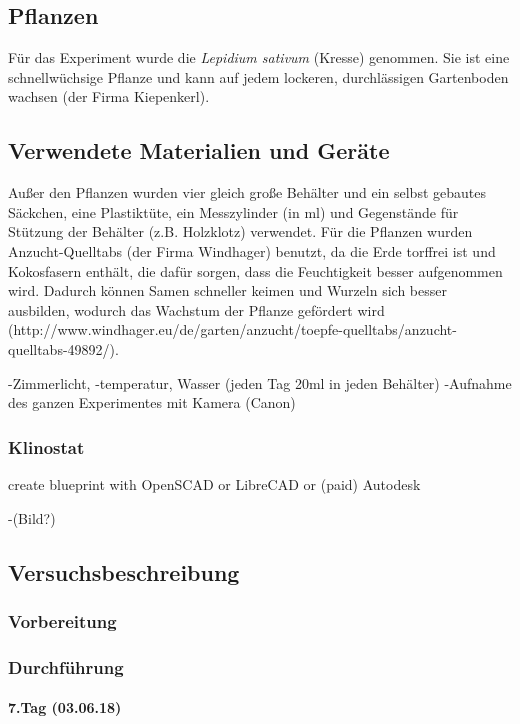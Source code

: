 \documentclass[
a4paper, 
11pt, 
ngerman,
listof=totoc,
bibliography=totocnumbered,
abstracton
]{scrreprt}
\begin{document}
\subsection{Pflanzen}

Für das Experiment wurde die \emph{Lepidium sativum} (Kresse) genommen. Sie ist eine schnellwüchsige Pflanze und kann auf jedem lockeren, durchlässigen Gartenboden wachsen (der Firma Kiepenkerl).



\subsection{Verwendete Materialien und Geräte}
Außer den Pflanzen wurden vier gleich große Behälter und ein selbst gebautes Säckchen, eine Plastiktüte, ein Messzylinder (in ml) und Gegenstände für Stützung der Behälter (z.B. Holzklotz) verwendet. Für die Pflanzen wurden Anzucht-Quelltabs (der Firma Windhager) benutzt, da die Erde torffrei ist und Kokosfasern enthält, die dafür sorgen, dass die Feuchtigkeit besser aufgenommen wird. Dadurch können Samen schneller keimen und Wurzeln sich besser ausbilden, wodurch das Wachstum der Pflanze gefördert wird (http://www.windhager.eu/de/garten/anzucht/toepfe-quelltabs/anzucht-quelltabs-49892/). 

-Zimmerlicht, -temperatur, Wasser (jeden Tag 20ml in jeden Behälter)
-Aufnahme des ganzen Experimentes mit Kamera (Canon)

\subsubsection{Klinostat}

create blueprint with OpenSCAD or LibreCAD or (paid) Autodesk

-(Bild?)

\subsection{Versuchsbeschreibung}

\subsubsection{Vorbereitung}

\subsubsection{Durchführung}

\paragraph{7.Tag (03.06.18)} 
\end{document}
